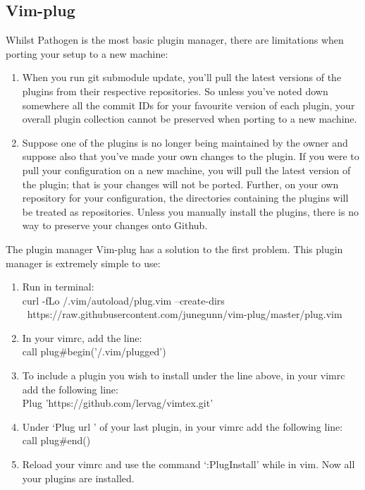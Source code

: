 \subsection{Vim-plug}
Whilst Pathogen is the most basic plugin manager, there are limitations when
porting your setup to a new machine:
\begin{enumerate}
    \item When you run git submodule update, you'll pull the latest versions of
        the plugins from their respective repositories. So unless you've noted
        down somewhere all the commit IDs for your favourite version of each
        plugin, your overall plugin collection cannot be preserved when porting
        to a new machine.
    \item Suppose one of the plugins is no longer being maintained by the owner
        and suppose also that you've made your own changes to the plugin. If you
        were to pull your configuration on a new machine, you will pull the
        latest version of the plugin; that is your changes will not be ported.
        Further, on your own repository for your configuration, the directories
        containing the plugins will be treated as repositories. Unless you
        manually install the plugins, there is no way to preserve your changes
        onto Github.
\end{enumerate}
The plugin manager Vim-plug \cite{junegunn2014vimplug} has a solution to the
first problem. This plugin manager is extremely simple to use:
\begin{enumerate}
    \item Run in terminal:\\
        curl -fLo \tsim/.vim/autoload/plug.vim --create-dirs \
        https://raw.githubusercontent.com/junegunn/vim-plug/master/plug.vim
    \item In your vimrc, add the line:\\
        call plug\#begin('\tsim/.vim/plugged')
    \item To include a plugin you wish to install under the line above, in your
        vimrc add the following line:\\
        Plug 'https://github.com/lervag/vimtex.git'
    \item Under `Plug \tlangle url \trangle' of your last plugin, in your vimrc
        add the following line:\\
        call plug\#end()
    \item Reload your vimrc and use the command `:PlugInstall' while in vim. Now
        all your plugins are installed.
\end{enumerate}
